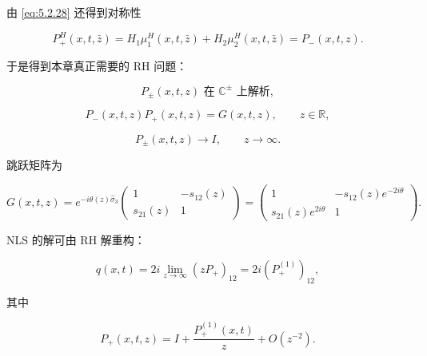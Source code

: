 \documentclass[
    lang=cn,
    scheme=chinese,
    mode=simple,
    device=normal,
    color=blue,
    math=cm,
    thmcnt=section,
    12pt,
    nowatermark
]{elegantbook}
\begin{document}
由 \eqref{eq:5.2.28} 还得到对称性

\begin{equation}
    P_+^H(x,t,\bar z)
    =
    H_1\mu_1^H(x,t,\bar z)
    +
    H_2\mu_2^H(x,t,\bar z)
    =
    P_-(x,t,z).
    \tag{5.3.3}
    \label{eq:5.3.3}
\end{equation}

于是得到本章真正需要的 RH 问题：

\begin{equation}
    P_\pm(x,t,z)\text{ 在 }\mathbb{C}^\pm\text{ 上解析},
    \tag{5.3.4}
    \label{eq:5.3.4}
\end{equation}

\begin{equation}
    P_-(x,t,z)P_+(x,t,z)
    =
    G(x,t,z),
    \qquad z\in\mathbb{R},
    \tag{5.3.5}
    \label{eq:5.3.5}
\end{equation}

\begin{equation}
    P_\pm(x,t,z)\to I,
    \qquad z\to\infty.
    \tag{5.3.6}
    \label{eq:5.3.6}
\end{equation}

跳跃矩阵为

\begin{equation}
    G(x,t,z)
    =
    e^{-i\theta(z)\widehat{\sigma}_3}
    \begin{pmatrix}
        1         & -s_{12}(z) \\
        s_{21}(z) & 1
    \end{pmatrix}=
    \begin{pmatrix}
        1                     & -s_{12}(z)e^{-2i\theta} \\
        s_{21}(z)e^{2i\theta} & 1
    \end{pmatrix}.
    \tag{5.3.7}
    \label{eq:5.3.7}
\end{equation}

NLS 的解可由 RH 解重构：

\begin{equation}
    q(x,t)
    =
    2i\lim\limits_{z\to\infty}(zP_+)_{12}
    =
    2i(P_+^{(1)})_{12},
    \tag{5.3.8}
    \label{eq:5.3.8}
\end{equation}

其中

\begin{equation}
    P_+(x,t,z)
    =
    I+\dfrac{P_+^{(1)}(x,t)}{z}
    +O(z^{-2}).
    \tag{5.3.9}
    \label{eq:5.3.9}
\end{equation}
\end{document}
